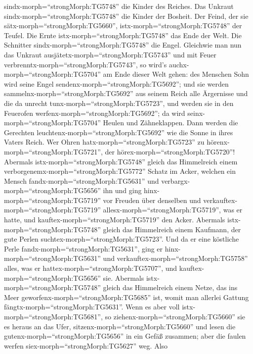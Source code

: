 sindx-morph=``strongMorph:TG5748'' die Kinder des Reiches. Das Unkraut
sindx-morph=``strongMorph:TG5748'' die Kinder der Bosheit. 
Der Feind, der sie sätx-morph=``strongMorph:TG5660'',
istx-morph=``strongMorph:TG5748'' der Teufel. Die Ernte
istx-morph=``strongMorph:TG5748'' das Ende der Welt. Die Schnitter
sindx-morph=``strongMorph:TG5748'' die Engel.  Gleichwie
man nun das Unkraut ausjätetx-morph=``strongMorph:TG5743'' und mit Feuer
verbrenntx-morph=``strongMorph:TG5743'', so wird's
auchx-morph=``strongMorph:TG5704'' am Ende dieser Welt gehen:
 des Menschen Sohn wird seine Engel
sendenx-morph=``strongMorph:TG5692''; und sie werden
sammelnx-morph=``strongMorph:TG5692'' aus seinem Reich alle Ärgernisse
und die da unrecht tunx-morph=``strongMorph:TG5723'',  und
werden sie in den Feuerofen werfenx-morph=``strongMorph:TG5692''; da
wird seinx-morph=``strongMorph:TG5704'' Heulen und Zähneklappen.
 Dann werden die Gerechten
leuchtenx-morph=``strongMorph:TG5692'' wie die Sonne in ihres Vaters
Reich. Wer Ohren hatx-morph=``strongMorph:TG5723'' zu
hörenx-morph=``strongMorph:TG5721'', der
hörex-morph=``strongMorph:TG5720''!  Abermals
istx-morph=``strongMorph:TG5748'' gleich das Himmelreich einem
verborgenemx-morph=``strongMorph:TG5772'' Schatz im Acker, welchen ein
Mensch fandx-morph=``strongMorph:TG5631'' und
verbargx-morph=``strongMorph:TG5656'' ihn und ging
hinx-morph=``strongMorph:TG5719'' vor Freuden über denselben und
verkauftex-morph=``strongMorph:TG5719''
allesx-morph=``strongMorph:TG5719'', was er hatte, und
kauftex-morph=``strongMorph:TG5719'' den Acker.  Abermals
istx-morph=``strongMorph:TG5748'' gleich das Himmelreich einem Kaufmann,
der gute Perlen suchtex-morph=``strongMorph:TG5723''.  Und
da er eine köstliche Perle fandx-morph=``strongMorph:TG5631'', ging er
hinx-morph=``strongMorph:TG5631'' und
verkauftex-morph=``strongMorph:TG5758'' alles, was er
hattex-morph=``strongMorph:TG5707'', und
kauftex-morph=``strongMorph:TG5656'' sie.  Abermals
istx-morph=``strongMorph:TG5748'' gleich das Himmelreich einem Netze,
das ins Meer geworfenx-morph=``strongMorph:TG5685'' ist, womit man
allerlei Gattung fängtx-morph=``strongMorph:TG5631''.  Wenn
es aber voll istx-morph=``strongMorph:TG5681'', so
ziehenx-morph=``strongMorph:TG5660'' sie es heraus an das Ufer,
sitzenx-morph=``strongMorph:TG5660'' und lesen die
gutenx-morph=``strongMorph:TG5656'' in ein Gefäß zusammen; aber die
faulen werfen siex-morph=``strongMorph:TG5627'' weg.  Also
